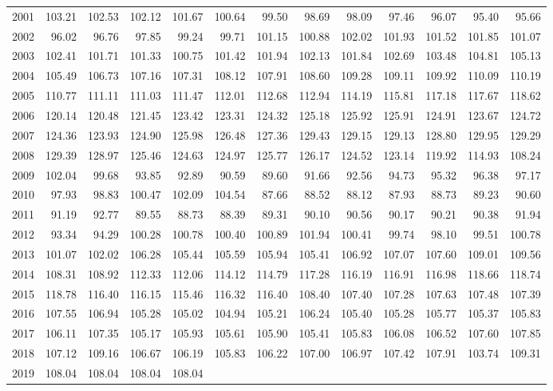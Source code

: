 \begin{longtable}{rrrrrrrrrrrrr}
  2001 & 103.21 & 102.53 & 102.12 & 101.67 & 100.64 & 99.50 & 98.69 & 98.09 & 97.46 & 96.07 & 95.40 & 95.66 \\ 
  2002 & 96.02 & 96.76 & 97.85 & 99.24 & 99.71 & 101.15 & 100.88 & 102.02 & 101.93 & 101.52 & 101.85 & 101.07 \\ 
  2003 & 102.41 & 101.71 & 101.33 & 100.75 & 101.42 & 101.94 & 102.13 & 101.84 & 102.69 & 103.48 & 104.81 & 105.13 \\ 
  2004 & 105.49 & 106.73 & 107.16 & 107.31 & 108.12 & 107.91 & 108.60 & 109.28 & 109.11 & 109.92 & 110.09 & 110.19 \\ 
  2005 & 110.77 & 111.11 & 111.03 & 111.47 & 112.01 & 112.68 & 112.94 & 114.19 & 115.81 & 117.18 & 117.67 & 118.62 \\ 
  2006 & 120.14 & 120.48 & 121.45 & 123.42 & 123.31 & 124.32 & 125.18 & 125.92 & 125.91 & 124.91 & 123.67 & 124.72 \\ 
  2007 & 124.36 & 123.93 & 124.90 & 125.98 & 126.48 & 127.36 & 129.43 & 129.15 & 129.13 & 128.80 & 129.95 & 129.29 \\ 
  2008 & 129.39 & 128.97 & 125.46 & 124.63 & 124.97 & 125.77 & 126.17 & 124.52 & 123.14 & 119.92 & 114.93 & 108.24 \\ 
  2009 & 102.04 & 99.68 & 93.85 & 92.89 & 90.59 & 89.60 & 91.66 & 92.56 & 94.73 & 95.32 & 96.38 & 97.17 \\ 
  2010 & 97.93 & 98.83 & 100.47 & 102.09 & 104.54 & 87.66 & 88.52 & 88.12 & 87.93 & 88.73 & 89.23 & 90.60 \\ 
  2011 & 91.19 & 92.77 & 89.55 & 88.73 & 88.39 & 89.31 & 90.10 & 90.56 & 90.17 & 90.21 & 90.38 & 91.94 \\ 
  2012 & 93.34 & 94.29 & 100.28 & 100.78 & 100.40 & 100.89 & 101.94 & 100.41 & 99.74 & 98.10 & 99.51 & 100.78 \\ 
  2013 & 101.07 & 102.02 & 106.28 & 105.44 & 105.59 & 105.94 & 105.41 & 106.92 & 107.07 & 107.60 & 109.01 & 109.56 \\ 
  2014 & 108.31 & 108.92 & 112.33 & 112.06 & 114.12 & 114.79 & 117.28 & 116.19 & 116.91 & 116.98 & 118.66 & 118.74 \\ 
  2015 & 118.78 & 116.40 & 116.15 & 115.46 & 116.32 & 116.40 & 108.40 & 107.40 & 107.28 & 107.63 & 107.48 & 107.39 \\ 
  2016 & 107.55 & 106.94 & 105.28 & 105.02 & 104.94 & 105.21 & 106.24 & 105.40 & 105.28 & 105.77 & 105.37 & 105.83 \\ 
  2017 & 106.11 & 107.35 & 105.17 & 105.93 & 105.61 & 105.90 & 105.41 & 105.83 & 106.08 & 106.52 & 107.60 & 107.85 \\ 
  2018 & 107.12 & 109.16 & 106.67 & 106.19 & 105.83 & 106.22 & 107.00 & 106.97 & 107.42 & 107.91 & 103.74 & 109.31 \\ 
  2019 & 108.04 & 108.04 & 108.04 & 108.04 &  &  &  &  &  &  &  &  \\ 
   \hline
\hline
\end{longtable}
